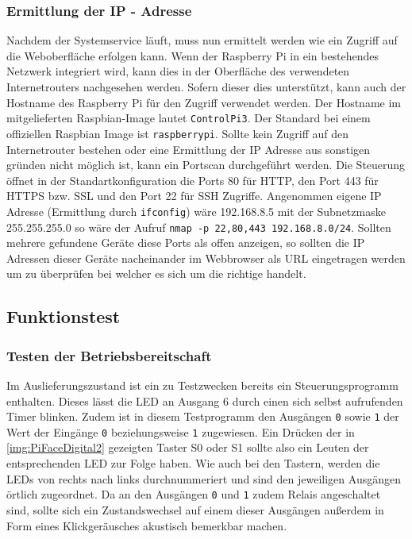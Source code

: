  \subsubsection{Ermittlung der IP - Adresse}\label{chp:ausw:ip}
 Nachdem der Systemservice läuft, muss nun ermittelt werden wie ein Zugriff auf die Weboberfläche erfolgen kann. Wenn der Raspberry Pi in ein bestehendes Netzwerk integriert wird, kann dies in der Oberfläche des verwendeten Internetrouters nachgesehen werden. Sofern dieser dies unterstützt, kann auch der Hostname des Raspberry Pi für den Zugriff verwendet werden. Der Hostname im mitgelieferten Raspbian-Image lautet \texttt{ControlPi3}. Der Standard bei einem offiziellen Raspbian Image ist \texttt{raspberrypi}. Sollte kein Zugriff auf den Internetrouter bestehen oder eine Ermittlung der IP Adresse aus sonstigen gründen nicht möglich ist, kann ein Portscan durchgeführt werden. Die Steuerung öffnet in der Standartkonfiguration die Ports 80 für HTTP, den Port 443 für HTTPS bzw. SSL und den Port 22 für SSH Zugriffe. Angenommen eigene IP Adresse (Ermittlung durch \texttt{ifconfig}) wäre 192.168.8.5 mit der Subnetzmaske 255.255.255.0 so wäre der Aufruf \texttt{nmap -p 22,80,443 192.168.8.0/24}. Sollten mehrere gefundene Geräte diese Ports als offen anzeigen, so sollten die IP Adressen dieser Geräte nacheinander im Webbrowser als URL eingetragen werden um zu überprüfen bei welcher es sich um die richtige handelt.   
 
 \subsection{Funktionstest}
 \subsubsection{Testen der Betriebsbereitschaft}
 Im Auslieferungszustand ist ein zu Testzwecken bereits ein Steuerungsprogramm enthalten. Dieses lässt die LED an Ausgang 6 durch einen sich selbst aufrufenden Timer blinken. Zudem ist in diesem Testprogramm den Ausgängen \texttt{0} sowie \texttt{1} der Wert der Eingänge \texttt{0} beziehungsweise \texttt{1} zugewiesen. Ein Drücken der in \autoref{img:PiFaceDigital2} gezeigten Taster S0 oder S1 sollte also ein Leuten der entsprechenden LED zur Folge haben. Wie auch bei den Tastern, werden die LEDs von rechts nach links durchnummeriert und sind den jeweiligen Ausgängen örtlich zugeordnet. Da an den Ausgängen \texttt{0} und \texttt{1} zudem Relais angeschaltet sind, sollte sich ein Zustandswechsel auf einem dieser Ausgängen außerdem in Form eines Klickgeräusches akustisch bemerkbar machen. 

